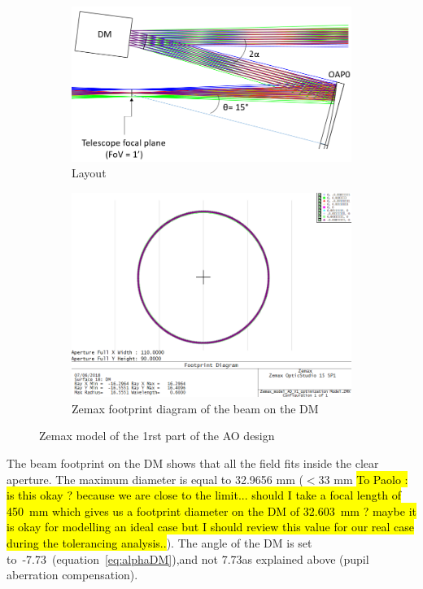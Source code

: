 \documentclass[12pt,a4paper]{article}
\begin{document}
\begin{figure}[H]
\begin{subfigure}[b]{0.45\textwidth}
	\begin{center}
		\includegraphics[width=\linewidth]{images/FP_OAP0.PNG}
		\caption{Layout}\label{fig:FP_OAP0}
	\end{center}
\end{subfigure}
\begin{subfigure}[b]{0.45\textwidth}
\begin{center}
		\includegraphics[width=\linewidth]{images/DM_beam_footprint.PNG}
		\caption{Zemax footprint diagram of the beam on the DM}\label{fig:DM_beam_footprint}
	\end{center}
\end{subfigure}
\caption{Zemax model of the 1rst part of the AO design}
\end{figure}

The beam footprint on the DM shows that all the field fits inside the clear aperture. The maximum diameter is equal to 32.9656 mm ($< 33$ mm \hl{To Paolo : is this okay ? because we are close to the limit... should I take a focal length of 450~mm which gives us a footprint diameter on the DM of 32.603~mm ? maybe it is okay for modelling an ideal case but I should review this value for our real case during the tolerancing analysis..}). The angle of the DM is set to~-7.73\degree~(equation~\eqref{eq:alphaDM}),and not 7.73\degree as explained above (pupil aberration compensation).
\end{document}
